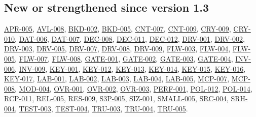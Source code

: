 \documentclass[11pt,a4paper]{article}
\newcommand{\rr}[1]{\hyperlink{req:#1}{#1}}
\begin{document}
\subsection*{New or strengthened since version 1.3}
\rr{APR-005}, \rr{AVL-008}, \rr{BKD-002}, \rr{BKD-005}, \rr{CNT-007}, \rr{CNT-009}, \rr{CRY-009}, \rr{CRY-010}, \rr{DAT-006}, \rr{DAT-007}, \rr{DEC-008}, \rr{DEC-011}, \rr{DEC-012}, \rr{DRV-001}, \rr{DRV-002}, \rr{DRV-003}, \rr{DRV-005}, \rr{DRV-007}, \rr{DRV-008}, \rr{DRV-009}, \rr{FLW-003}, \rr{FLW-004}, \rr{FLW-005}, \rr{FLW-007}, \rr{FLW-008}, \rr{GATE-001}, \rr{GATE-002}, \rr{GATE-003}, \rr{GATE-004}, \rr{INV-006}, \rr{INV-009}, \rr{KEY-001}, \rr{KEY-012}, \rr{KEY-013}, \rr{KEY-014}, \rr{KEY-015}, \rr{KEY-016}, \rr{KEY-017}, \rr{LAB-001}, \rr{LAB-002}, \rr{LAB-003}, \rr{LAB-004}, \rr{LAB-005}, \rr{MCP-007}, \rr{MCP-008}, \rr{MOD-004}, \rr{OVR-001}, \rr{OVR-002}, \rr{OVR-003}, \rr{PERF-001}, \rr{POL-012}, \rr{POL-014}, \rr{RCP-011}, \rr{REL-005}, \rr{RES-009}, \rr{S3P-005}, \rr{SIZ-001}, \rr{SMALL-005}, \rr{SRC-004}, \rr{SRH-004}, \rr{TEST-003}, \rr{TEST-004}, \rr{TRU-003}, \rr{TRU-004}, \rr{TRU-005}.

\end{document}
